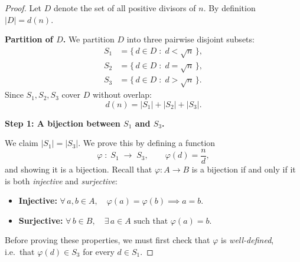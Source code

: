 \documentclass[12pt]{article}
\theoremstyle{remark}
\begin{document}
\begin{proof}
Let $D$ denote the set of all positive divisors of $n$.  By definition
$|D| = d(n)$.

\smallskip
\noindent\textbf{Partition of $D$.}\;
We partition $D$ into three pairwise disjoint subsets:
\begin{align*}
    S_1 &= \bigl\{\, d \in D \;:\; d < \sqrt{n} \,\bigr\}, \\
    S_2 &= \bigl\{\, d \in D \;:\; d = \sqrt{n} \,\bigr\}, \\
    S_3 &= \bigl\{\, d \in D \;:\; d > \sqrt{n} \,\bigr\}.
\end{align*}
Since $S_1, S_2, S_3$ cover $D$ without overlap:
\[
    d(n) = |S_1| + |S_2| + |S_3|.
\]

\bigskip
\noindent\textbf{Step 1: A bijection between $S_1$ and $S_3$.}

We claim $|S_1| = |S_3|$.  We prove this by defining a function
\[
    \varphi \;:\; S_1 \;\longrightarrow\; S_3, \qquad \varphi(d) = \frac{n}{d},
\]
and showing it is a bijection.  Recall that $\varphi : A \to B$ is a bijection
if and only if it is both \emph{injective} and \emph{surjective}:
\begin{itemize}
    \item \textbf{Injective:} $\forall\, a, b \in A,\quad \varphi(a) = \varphi(b) \implies a = b$.
    \item \textbf{Surjective:} $\forall\, b \in B,\quad \exists\, a \in A \text{ such that } \varphi(a) = b$.
\end{itemize}
Before proving these properties, we must first check that $\varphi$ is
\emph{well-defined}, i.e.\ that $\varphi(d) \in S_3$ for every $d \in S_1$.


\end{proof}
\end{document}
